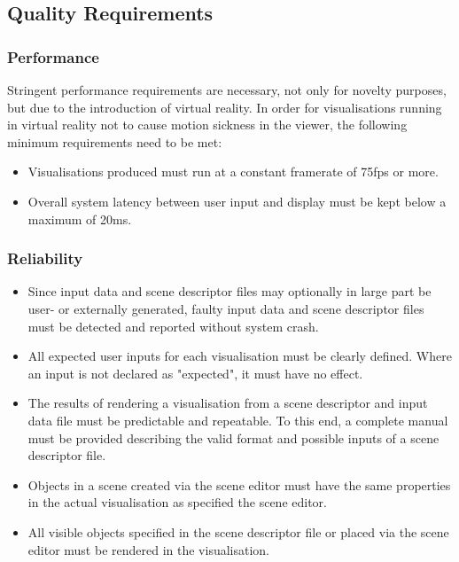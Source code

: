 \documentclass[a4paper,12pt]{article}
\begin{document}
\subsection{Quality Requirements}
	
	\subsubsection{Performance}
	
		Stringent performance requirements are necessary, not only for novelty purposes, but due to the introduction of virtual reality. In order for visualisations running in virtual reality not to cause motion sickness in the viewer, the following minimum requirements need to be met:
		
		\begin{itemize}
			\item Visualisations produced must run at a constant framerate of 75fps or more.
			\item Overall system latency between user input and display must be kept below a maximum of 20ms.
		\end{itemize}
	
	\subsubsection{Reliability}
	
		\begin{itemize}
			\item Since input data and scene descriptor files may optionally in large part be user- or externally generated, faulty input data and scene descriptor files must be detected and reported without system crash.
			\item All expected user inputs for each visualisation must be clearly defined. Where an input is not declared as "expected", it must have no effect.
			\item The results of rendering a visualisation from a scene descriptor and input data file must be predictable and repeatable. To this end, a complete manual must be provided describing the valid format and possible inputs of a scene descriptor file. 
			\item Objects in a scene created via the scene editor must have the same properties in the actual visualisation as specified the scene editor.
			\item All visible objects specified in the scene descriptor file or placed via the scene editor must be rendered in the visualisation.
		\end{itemize}
		
\end{document}
